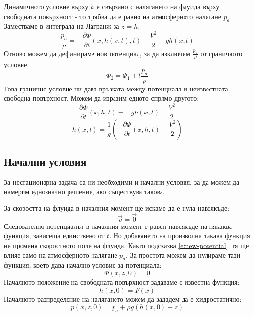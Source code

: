 \documentclass[12pt]{article}
\numberwithin{equation}{section}
\begin{document}
Динамичното условие върху $h$ е свързано с налягането на флуида върху свободната повърхност - то трябва да е равно на атмосферното налягане $p_a$. Заместваме в интеграла на Лагранж за $z=h$:
\begin{equation}
    \label{e:lagrange-integral}
    \frac{p_a}{\rho} = -\frac{\partial \Phi}{\partial t}\left(x,h(x,t),t\right) - \frac{V^2}{2} - gh(x,t)
\end{equation}
Отново можем да дефинираме нов потенциал, за да изключим $\frac{p_a}{\rho}$ от граничното условие.
\begin{equation}
    \label{e:new-potential}
    \Phi_2 = \Phi_1 + t \frac{p_a}{\rho}
\end{equation}
Това гранично условие ни дава връзката между потенциала и неизвестната свободна повърхност. Можем да изразим едното спрямо другото:
\begin{equation}
    \label{e:dynamic-condition}
    \frac{\partial \Phi}{\partial t}(x, h, t) = -g h(x, t) - \frac{V^2}{2}
\end{equation}
\begin{equation}
    h(x, t) = \frac{1}{g} \left( -\frac{\partial \Phi}{\partial t}(x, h, t) - \frac{V^2}{2} \right)
\end{equation}
\subsection{Начални условия}
За нестационарна задача са ни необходими и начални условия, за да можем да намерим еднозначно решение, ако съществува такова.

За скоростта на флуида в началния момент ще искаме да е нула навсякъде:
\begin{equation}
    \vec{v}=\vec{0}
\end{equation}
Следователно потенциалът в началния момент е равен навсякъде на някаква функция, зависеща единствено от $t$. Но добавянето на произволна такава функция не променя скоростното поле на флуида. Както подсказва \autoref{e:new-potential}, тя ще влияе само на атмосферното налягане $p_a$. За простота можем да нулираме тази функция, което дава начално условие за потенциала:
\begin{equation}
    \Phi(x,z,0) = 0
\end{equation}
Началното положение на свободната повърхност задаваме с известна функция:
\begin{equation}
    \label{e:free-surface-initial-condition}
    h(x,0)=F(x)
\end{equation}
Началното разпределение на налягането можем да зададем да е хидростатично:
\begin{equation}
    p(x,z,0)=p_a + \rho g (h(x,0)-z)
\end{equation}
\end{document}
